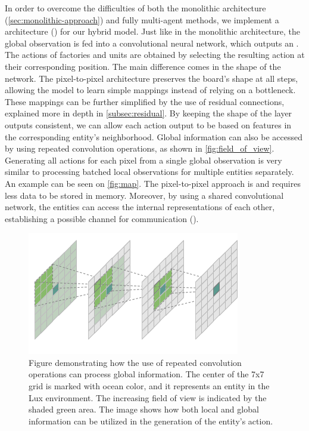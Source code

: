 \noindent In order to overcome the difficulties of both the monolithic architecture (\autoref{sec:monolithic-approach}) and fully multi-agent methods, we implement a  architecture \label{par:pixel-to-pixel} (\cite{chen2023emergent}) for our hybrid  model. Just like in the monolithic architecture, the global observation is fed into a convolutional neural network, which outputs an . The actions of factories and units are obtained by selecting the resulting action at their corresponding position. The main difference comes in the shape of the network. The pixel-to-pixel architecture preserves the board's shape at all steps, allowing the model to learn simple mappings instead of relying on a bottleneck. These mappings can be further simplified by the use of residual connections, explained more in depth in \autoref{subsec:residual}. By keeping the shape of the layer outputs consistent, we can allow each action output to be based on features in the corresponding entity's neighborhood. Global information can also be accessed by using repeated convolution operations, as shown in \autoref{fig:field_of_view}. Generating all actions for each pixel from a single global observation is very similar to processing batched local observations for multiple entities separately. An example can be seen on \autoref{fig:map}. The pixel-to-pixel approach is  and requires less data to be stored in memory. Moreover, by using a shared convolutional network, the entities can access the internal representations of each other, establishing a possible channel for communication (\cite{pmlr-v97-han19a}).

\begin{figure}[htbp]
    \centering
    \includegraphics[width=0.7\linewidth]{images/methods_hybrid/field_of_view.png}
    \captionsetup{justification=justified, singlelinecheck=false, width=1\linewidth, labelfont=bf} 
    \caption[]{Figure demonstrating how the use of repeated convolution operations can process global information. The center of the 7x7 grid is marked with ocean color, and it represents an entity in the Lux environment. The increasing field of view is indicated by the shaded green area. The image shows how both local and global information can be utilized in the generation of the entity's action.}
    \label{fig:field_of_view}
\end{figure}

